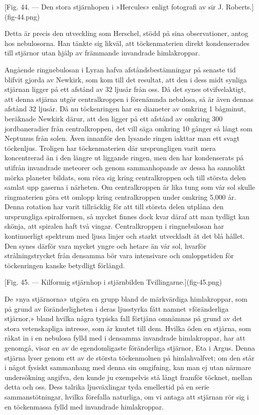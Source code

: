 \documentclass[a4paper, 12pt, oneside, swedish]{article}
\begin{document}
[Fig. 44. --- Den stora stjärnhopen i »Hercules» enligt fotografi av sir J. Roberts.](fig-44.png)

Detta är precis den utveckling som Herschel, stödd på sina observationer, antog hos nebulosorna. Han tänkte sig likväl, att töckenmaterien direkt kondenserades till stjärnor utan hjälp av främmande invandrade himlakroppar.

Angående ringnebulosan i Lyran hafva afståndsbestämningar på senaste tid blifvit gjorda av Newkirk, som kom till det resultat, att den i dess midt synliga stjärnan ligger på ett afstånd av 32 ljusår från oss. Då det synes otvifvelaktigt, att denna stjärna utgör centralkroppen i förenämnda nebulosa, så är även dennas afstånd 32 ljusår. Då nu töckenringen har en diameter av omkring 1 bågminut, beräknade Newkirk därur, att den ligger på ett afstånd av omkring 300 jordbaneradier från centralkroppen, det vill säga omkring 10 gånger så långt som Neptunus från solen. Även innanför den lysande ringen iakttar man ett svagt töckenljus. Troligen har töckenmaterien där ursprungligen varit mera koncentrerad än i den längre ut liggande ringen, men den har kondenserats på utifrån invandrade meteorer och genom sammanhopande av dessa ha sannolikt mörka planeter bildats, som röra sig kring centralkroppen och till största delen samlat upp gaserna i närheten. Om centralkroppen är lika tung som vår sol skulle ringmaterien göra ett omlopp kring centralkroppen under omkring 5,000 år. Denna rotation har varit tillräcklig för att till största delen utplåna den ursprungliga spiralformen, så mycket finnes dock kvar däraf att man tydligt kan skönja, att spiralen haft två vingar. Centralkroppen i ringnebulosan har kontinuerligt spektrum med ljusa linjer och starkt utveckladt åt det blå hållet. Den synes därför vara mycket yngre och hetare än vår sol, hvarför strålningstrycket från densamma bör vara intensivare och omloppstiden för töckenringen kanske betydligt förlängd.

[Fig. 45. --- Kilformig stjärnhop i stjärnbilden Tvillingarne.](fig-45.png)

De »nya stjärnorna» utgöra en grupp bland de märkvärdiga himlakroppar, som på grund av föränderligheten i deras ljusstyrka fått namnet »föränderliga stjärnor,» bland hvilka några typiska fall förtjäna omnämnas på grund av det stora vetenskapliga intresse, som är knutet till dem. Hvilka öden en stjärna, som råkat in i en nebulosa fylld med i densamma invandrade himlakroppar, har att genomgå, visar en av de egendomligaste föränderliga stjärnor, Eta i Argus. Denna stjärna lyser genom ett av de största töckenmolnen på himlahvalfvet; om den står i något fysiskt sammanhang med denna sin omgifning, kan man ej utan närmare undersökning angifva, den kunde ju exempelvis stå långt framför töcknet, mellan detta och oss. Dess talrika ljusväxlingar tyda emellertid på en serie sammanstötningar, hvilka förefalla naturliga, om vi antaga att stjärnan rör sig i en töckenmassa fylld med invandrade himlakroppar.
\end{document}
